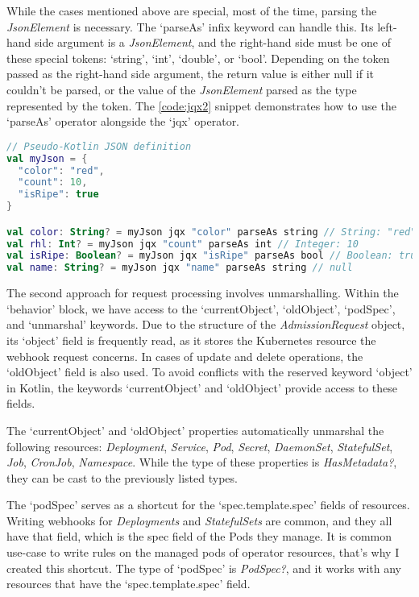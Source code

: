 While the cases mentioned above are special, most of the time, parsing the \emph{JsonElement} is necessary. The `parseAs' infix keyword can handle this. Its left-hand side argument is a \emph{JsonElement}, and the right-hand side must be one of these special tokens: `string', `int', `double', or `bool'. Depending on the token passed as the right-hand side argument, the return value is either null if it couldn't be parsed, or the value of the \emph{JsonElement} parsed as the type represented by the token. The \ref{code:jqx2} snippet demonstrates how to use the `parseAs' operator alongside the `jqx' operator.

\begin{lstlisting}[caption={Usage of `parseAs'},language=Kotlin,label=code:jqx2]
// Pseudo-Kotlin JSON definition
val myJson = {
  "color": "red",
  "count": 10,
  "isRipe": true
}

val color: String? = myJson jqx "color" parseAs string // String: "red"
val rhl: Int? = myJson jqx "count" parseAs int // Integer: 10
val isRipe: Boolean? = myJson jqx "isRipe" parseAs bool // Boolean: true
val name: String? = myJson jqx "name" parseAs string // null
\end{lstlisting}

The second approach for request processing involves unmarshalling. Within the `behavior' block, we have access to the `currentObject', `oldObject', `podSpec', and `unmarshal' keywords. Due to the structure of the \emph{AdmissionRequest} object, its `object' field is frequently read, as it stores the Kubernetes resource the webhook request concerns. In cases of update and delete operations, the `oldObject' field is also used. To avoid conflicts with the reserved keyword `object' in Kotlin, the keywords `currentObject' and `oldObject' provide access to these fields.

The `currentObject' and `oldObject' properties automatically unmarshal the following resources: \emph{Deployment}, \emph{Service}, \emph{Pod}, \emph{Secret}, \emph{DaemonSet}, \emph{StatefulSet}, \emph{Job}, \emph{CronJob}, \emph{Namespace}. While the type of these properties is \emph{HasMetadata?}, they can be cast to the previously listed types.

The `podSpec' serves as a shortcut for the `spec.template.spec' fields of resources. Writing webhooks for \emph{Deployments} and \emph{StatefulSets} are common, and they all have that field, which is the spec field of the Pods they manage. It is common use-case to write rules on the managed pods of operator resources, that's why I created this shortcut. The type of `podSpec' is \emph{PodSpec?}, and it works with any resources that have the `spec.template.spec' field.

